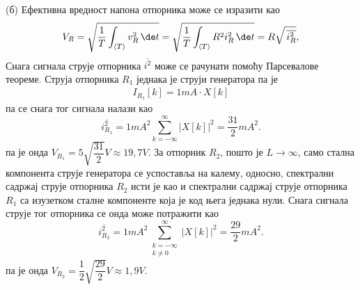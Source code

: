(б) Ефективна вредност напона отпорника може се изразити као 
\begin{eqnarray}
    V_R = \sqrt{ \dfrac{1}{T} \int_{\langle T \rangle} v_R^2  \, \de t  }
        = \sqrt{ \dfrac{1}{T} \int_{\langle T \rangle} R^2 i_R^2  \, \de t  }
        = R \sqrt{ \, \overline{i_R^2} },
\end{eqnarray}
Снага сигнала струје отпорника $\overline{i^2}$ може се рачунати помоћу Парсевалове теореме. Струја
отпорника $R_1$ једнака је струји генератора па је 
\begin{eqnarray}
    I_{R_1}[k] = 1\unit{mA} \cdot X[k]
\end{eqnarray}
па се снага тог сигнала налази као 
\begin{equation}
    \overline{i_{R_1}^2} = 1 \unit{mA^2} \sum_{k = -\infty}^{\infty} |X[k]|^2 = \dfrac{31}{2} \unit{mA^2}.
\end{equation}
па је онда $V_{R_1} = 5 \sqrt{\dfrac{31}{2}} \unit{V} \approx 19,7 \unit{V}$. За отпорник $R_2$, пошто је $L \to \infty$, само 
стална компонента струје генератора се успоставља на калему, односно, спектрални садржај струје отпорника 
$R_2$ исти је као и спектрални садржај струје отпорника $R_1$ са изузетком сталне компоненте која је код 
њега једнака нули. Снага сигнала струје тог отпорника се онда може потражити као
\begin{equation}
    \overline{i_{R_2}^2} = 1 \unit{mA^2} \sum_{ \substack{k = -\infty\\k\neq 0}}^{\infty} |X[k]|^2 = \dfrac{29}{2} \unit{mA^2}.
\end{equation}
па је онда $V_{R_2} = \dfrac{1}{2} \sqrt{ \dfrac{29}{2} } \unit{V} \approx 1,9 \unit{V}$.